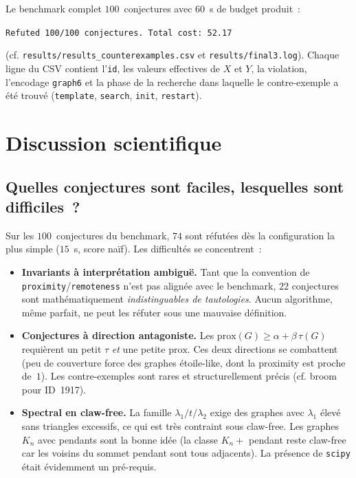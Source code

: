 \documentclass[11pt,a4paper]{article}
\begin{document}
Le benchmark complet $100$~conjectures avec $60$~s de budget produit~:
\begin{center}
  \texttt{Refuted 100/100 conjectures. Total cost: 52.17}
\end{center}
(cf. \texttt{results/results\_counterexamples.csv} et
\texttt{results/final3.log}). Chaque ligne du CSV contient l'\texttt{id},
les valeurs effectives de $X$ et $Y$, la violation, l'encodage
\texttt{graph6} et la phase de la recherche dans laquelle le contre-exemple
a été trouvé (\texttt{template}, \texttt{search}, \texttt{init}, \texttt{restart}).

\section{Discussion scientifique}

\subsection{Quelles conjectures sont faciles, lesquelles sont difficiles~?}

Sur les $100$~conjectures du benchmark, $74$ sont réfutées dès la
configuration la plus simple ($15$~s, score naïf). Les difficultés se
concentrent~:
\begin{itemize}
  \item \textbf{Invariants à interprétation ambiguë.} Tant que la convention
    de \texttt{proximity}/\texttt{remoteness} n'est pas alignée avec le
    benchmark, $22$ conjectures sont mathématiquement \emph{indistinguables
    de tautologies}. Aucun algorithme, même parfait, ne peut les réfuter
    sous une mauvaise définition.
  \item \textbf{Conjectures à direction antagoniste.} Les
    \og{}$\mathrm{prox}(G) \ge \alpha + \beta\,\tau(G)$\fg{} requièrent un
    petit $\tau$ \emph{et} une petite $\mathrm{prox}$. Ces deux directions
    se combattent (peu de couverture force des graphes étoile-like, dont la
    proximity est proche de~$1$). Les contre-exemples sont rares et
    structurellement précis (cf. \og{}broom\fg{} pour ID~1917).
  \item \textbf{Spectral en claw-free.} La famille $\lambda_1 / t /
    \lambda_2$ exige des graphes avec $\lambda_1$ élevé sans triangles
    excessifs, ce qui est très contraint sous claw-free. Les graphes
    \og{}$K_n$ avec pendants\fg{} sont la bonne idée (la classe $K_n + $
    pendant reste claw-free car les voisins du sommet pendant sont tous
    adjacents). La présence de \texttt{scipy} était évidemment un
    pré-requis.
\end{itemize}
\end{document}
